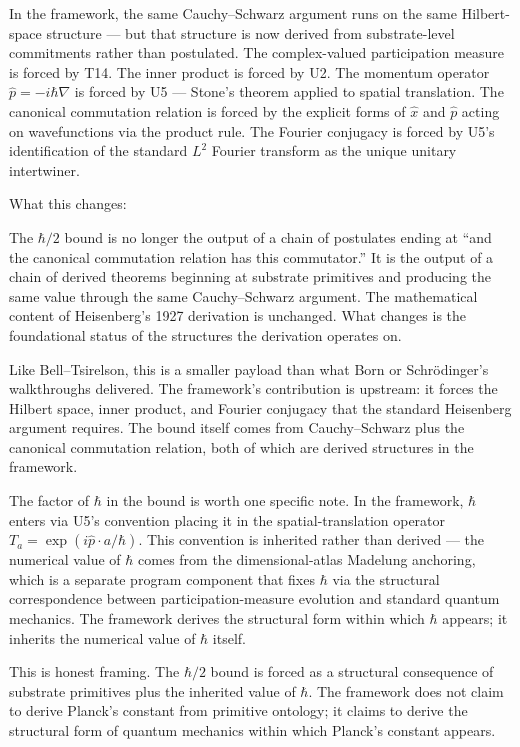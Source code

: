 \documentclass[11pt,a4paper]{article}
\begin{document}
In the framework, the same Cauchy--Schwarz argument runs on the same Hilbert-space structure --- but that structure is now derived from substrate-level commitments rather than postulated. The complex-valued participation measure is forced by T14. The inner product is forced by U2. The momentum operator $\hat{p} = -i\hbar\nabla$ is forced by U5 --- Stone's theorem applied to spatial translation. The canonical commutation relation is forced by the explicit forms of $\hat{x}$ and $\hat{p}$ acting on wavefunctions via the product rule. The Fourier conjugacy is forced by U5's identification of the standard $L^2$ Fourier transform as the unique unitary intertwiner.

What this changes:

The $\hbar/2$ bound is no longer the output of a chain of postulates ending at ``and the canonical commutation relation has this commutator.'' It is the output of a chain of derived theorems beginning at substrate primitives and producing the same value through the same Cauchy--Schwarz argument. The mathematical content of Heisenberg's 1927 derivation is unchanged. What changes is the foundational status of the structures the derivation operates on.

Like Bell--Tsirelson, this is a smaller payload than what Born or Schr\"odinger's walkthroughs delivered. The framework's contribution is upstream: it forces the Hilbert space, inner product, and Fourier conjugacy that the standard Heisenberg argument requires. The bound itself comes from Cauchy--Schwarz plus the canonical commutation relation, both of which are derived structures in the framework.

The factor of $\hbar$ in the bound is worth one specific note. In the framework, $\hbar$ enters via U5's convention placing it in the spatial-translation operator $T_a = \exp(i\hat{p}\cdot a/\hbar)$. This convention is inherited rather than derived --- the numerical value of $\hbar$ comes from the dimensional-atlas Madelung anchoring, which is a separate program component that fixes $\hbar$ via the structural correspondence between participation-measure evolution and standard quantum mechanics. The framework derives the structural form within which $\hbar$ appears; it inherits the numerical value of $\hbar$ itself.

This is honest framing. The $\hbar/2$ bound is forced as a structural consequence of substrate primitives plus the inherited value of $\hbar$. The framework does not claim to derive Planck's constant from primitive ontology; it claims to derive the structural form of quantum mechanics within which Planck's constant appears.
\end{document}
